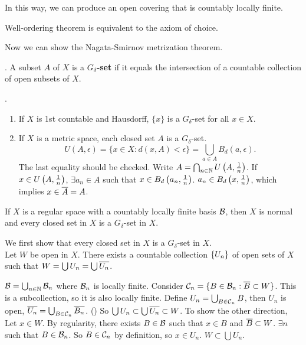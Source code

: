 In this way, we can produce an open covering that is countably locally finite.

\rmk Well-ordering theorem is equivalent to the axiom of choice.

Now we can show the Nagata-Smirnov metrization theorem.


.  A subset \(A\) of \(X\) is a \textbf{\(G_\delta\)-set} if it equals the intersection of a countable collection of open subsets of \(X\).

\ex.
\begin{enumerate}
    \item If \(X\) is 1st countable and Hausdorff, \(\{x\}\) is a \(G_\delta\)-set for all \(x \in X\).
    \item If \(X\) is a metric space, each closed set \(A\) is a \(G_\delta\)-set.
    \[
        U(A, \epsilon) = \{x \in X : d(x, A) < \epsilon\} = \bigcup_{a \in A} B_d(a, \epsilon).
    \]
    The last equality should be checked. Write \(A = \bigcap_{n \in \mathbb{N}} U\left( A, \frac{1}{n} \right)\). If \(x \in U\left( A, \frac{1}{n} \right)\), \(\exists a_n \in A\) such that \(x \in B_d\left( a_n, \frac{1}{n} \right)\). \(a_n \in B_d\left( x, \frac{1}{n} \right)\), which implies \(x \in \overline{A} = A\).
\end{enumerate}

 If \(X\) is a regular space with a countably locally finite basis \(\mathcal{B}\), then \(X\) is normal and every closed set in \(X\) is a \(G_\delta\)-set in \(X\).

\pf We first show that every closed set in \(X\) is a \(G_\delta\)-set in \(X\). \\
 Let \(W\) be open in \(X\). There exists a countable collection \(\left\{ U_n \right\}\) of open sets of \(X\) such that \(W = \bigcup U_n = \bigcup \overline{U_n}\).

\(\mathcal{B} = \bigcup_{n \in \mathbb{N}} \mathcal{B}_n\) where \(\mathcal{B}_n\) is locally finite. Consider \(\mathcal{C}_n = \{B \in \mathcal{B}_n : \overline{B} \subset W\}\). This is a subcollection, so it is also locally finite. Define \(U_n = \bigcup_{B \in \mathcal{C}_n} B\), then \(U_n\) is open, \(\overline{U_n} = \bigcup_{B \in \mathcal{C}_n} \overline{B_n}\). () So \(\bigcup U_n \subset \bigcup \overline{U_n} \subset W\). To show the other direction, Let \(x \in W\). By regularity, there exists \(B \in \mathcal{B}\) such that \(x \in B\) and \(\overline{B} \subset W\). \(\exists n\) such that \(B \in \mathcal{B}_n\). So \(B \in \mathcal{C}_n\) by definition, so \(x \in U_n\). \(W \subset \bigcup U_n\).

